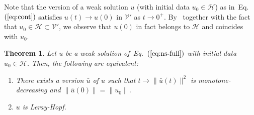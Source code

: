 \documentclass{article}
\newtheorem{thm}[definition]{Theorem}
\def\eq#1{Eq.~$(\ref{#1})$}
\def\H{{\mathcal{H}}}
\def\V{{\mathcal{V}}}
\begin{document}
Note that the version of a weak solution $u$ (with initial data $u_0 \in \H$) as in~\eq{eq:cont} satisfies $u(t) \to  u(0)$ in $\V'$ as $t \to 0^+$. By~\cite[Theorem 3.8]{RobRodSad16} together with the fact that $u_0 \in \H \subset \V'$, we observe that $u(0)$ in fact belongs to $\H$ and coincides with $u_0$.


\begin{thm}
  \label{thm:lh}
    Let $u$ be a weak solution of~\eq{eq:ns-full} with initial data $u_0 \in \H$. Then, the following are equivalent:
    \begin{enumerate}
    \item There exists a version $\bar u$ of $u$ such that
      $t \to \lVert \bar u(t) \rVert^2$ is monotone-decreasing and
      $\lVert \bar u(0)\rVert = \lVert u_0\rVert$.
    \item $u$ is Leray-Hopf.
    \end{enumerate}
\end{thm}
\end{document}
